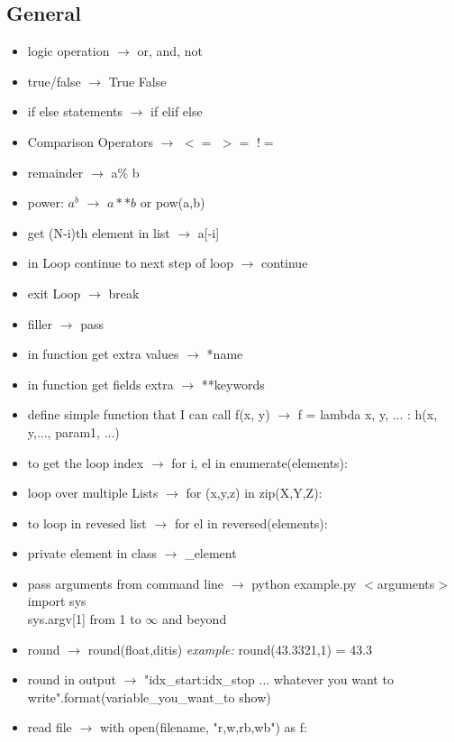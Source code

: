 \documentclass{article}
\begin{document}
\begin{multicols}{2}
\section{General}
\begin{itemize}
\item logic operation $\rightarrow$ or, and, not
\item true/false $\rightarrow$ True False
\item if else statements $\rightarrow$ if elif else
\item Comparison Operators $\rightarrow$ $<=$ \quad  $>=$ \quad    $!=$  
\item remainder  $\rightarrow$ a\% b
\item power: $a^{b}$ $\rightarrow$ $a**b$ or pow(a,b)
\item get (N-i)th element in list $\rightarrow$ a[-i]
\item in Loop continue to next step of loop $\rightarrow$ continue
\item exit Loop $\rightarrow$ break
\item filler $\rightarrow$ pass
\item in function get extra values $\rightarrow$ *name
\item in function get fields extra $\rightarrow$ **keywords
\item define simple function that I can call f(x, y) $\rightarrow$ f = lambda x, y, ... : h(x, y,..., param1, ...)
\item to get the loop index $\rightarrow$ for i, el in enumerate(elements):
\item loop over multiple Lists $\rightarrow$ for (x,y,z) in zip(X,Y,Z):
\item to loop in revesed list $\rightarrow$ for  el in reversed(elements):
\item private element in class $\rightarrow$ \_element
\item pass arguments from command line $\rightarrow$ python example.py $<$arguments$>$      \\
                                                import sys \\
                                                sys.argv[1]  from 1 to $\infty$ and beyond
\item round $\rightarrow$ round(float,ditis) \textit{example:} round(43.3321,1) = 43.3
\item round in output $\rightarrow$ "{idx\_start:idx\_stop} ... whatever you want to write".format(variable\_you\_want\_to show)
\item read file $\rightarrow$ with open(filename, "r,w,rb,wb") as f:

\end{itemize}
\end{multicols}
\end{document}
